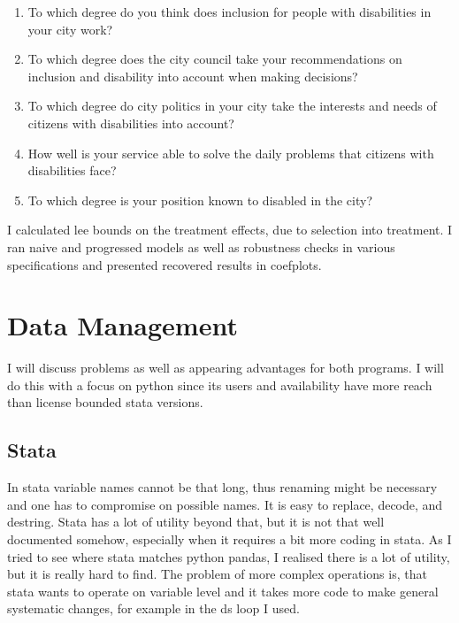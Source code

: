 \documentclass[10pt]{article}
\begin{document}
\begin{enumerate}

\item To which degree do you think does inclusion for people with disabilities in your city work? 

\item To which degree does the city council take your recommendations on inclusion and disability into account when making decisions?

\item To which degree do city politics in your city take the interests and needs of citizens with disabilities into account?

\item How well is your service able to solve the daily problems that citizens with disabilities face?

\item To which degree is your position known to disabled in the city?

\end{enumerate}

I calculated lee bounds on the treatment effects, due to selection into treatment. I ran naive and progressed
models as well as robustness checks in various specifications and presented recovered results in coefplots.

\section{Data Management}
I will discuss problems as well as appearing advantages for both programs.
I will do this with a focus on python since its users and availability have more 
reach than license bounded stata versions.
\subsection{Stata}
In stata variable names cannot be that long, thus renaming might be necessary and one has to compromise 
on possible names.
It is easy to replace, decode, and destring. Stata has a lot of utility beyond that, but it is not that well documented
somehow, especially when it requires a bit more coding in stata. As I tried to see where stata matches python pandas, 
I realised there is a lot of utility, but it is really hard to find. The problem of more complex operations is,
that stata wants to operate on variable level and it takes more code to make general systematic changes, for example in the ds loop I used.
\end{document}
